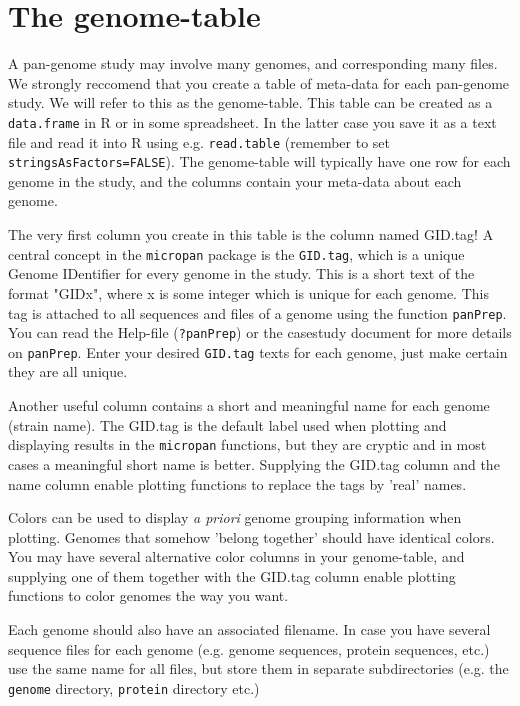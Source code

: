 \documentclass{article}
\begin{document}
\section{The genome-table}
A pan-genome study may involve many genomes, and corresponding many files. We strongly reccomend that you create a table of meta-data for each pan-genome study. We will refer to this as the genome-table. This table can be created as a \texttt{data.frame} in R or in some spreadsheet. In the latter case you save it as a text file and read it into R using e.g. \texttt{read.table} (remember to set \texttt{stringsAsFactors=FALSE}). The genome-table will typically have one row for each genome in the study, and the columns contain your meta-data about each genome. 

The very first column you create in this table is the column named GID.tag! A central concept in the \texttt{micropan} package is the \texttt{GID.tag}, which is a unique Genome IDentifier for every genome in the study. This is a short text of the format "GIDx", where x is some integer which is unique for each genome. This tag is attached to all sequences and files of a genome using the function \texttt{panPrep}. You can read the Help-file (\texttt{?panPrep}) or the casestudy document for more details on \texttt{panPrep}. Enter your desired \texttt{GID.tag} texts for each genome, just make certain they are all unique. 

Another useful column contains a short and meaningful name for each genome (strain name). The GID.tag is the default label used when plotting and displaying results in the \texttt{micropan} functions, but they are cryptic and in most cases a meaningful short name is better. Supplying the GID.tag column and the name column enable plotting functions to replace the tags by 'real' names.

Colors can be used to display \emph{a priori} genome grouping information when plotting. Genomes that somehow 'belong together' should have identical colors. You may have several alternative color columns in your genome-table, and supplying one of them together with the GID.tag column enable plotting functions to color genomes the way you want.

Each genome should also have an associated filename. In case you have several sequence files for each genome (e.g. genome sequences, protein sequences, etc.) use the same name for all files, but store them in separate subdirectories (e.g. the \texttt{genome} directory, \texttt{protein} directory etc.)
\end{document}

